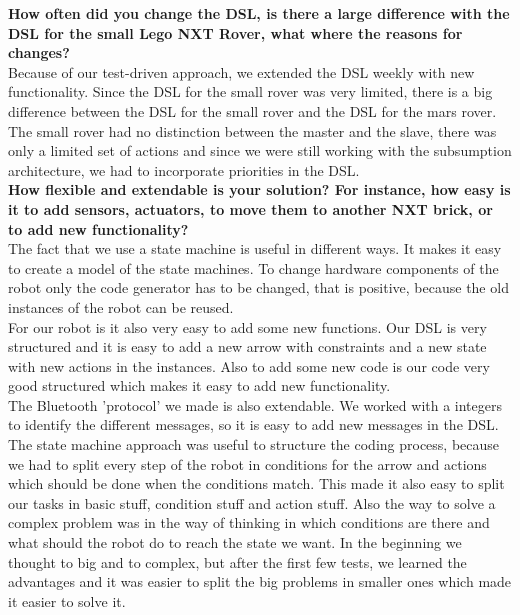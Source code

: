 \documentclass[11pt,a4paper]{article}
\begin{document}
\textbf{How often did you change the DSL, is there a large difference with the DSL for the small Lego NXT Rover, what where the reasons for changes?}\\
Because of our test-driven approach, we extended the DSL weekly with new functionality. Since the DSL for the small rover was very limited, there is a big difference between the DSL for the small rover and the DSL for the mars rover. The small rover had no distinction between the master and the slave, there was only a limited set of actions and since we were still working with the subsumption architecture, we had to incorporate priorities in the DSL.\\

\textbf{How flexible and extendable is your solution? For instance, how easy is it to add sensors, actuators, to move them to another NXT brick, or to add new functionality?}\\
The fact that we use a state machine is useful in different ways. It makes it easy to create a model of the state machines. To change hardware components of the robot only the code generator has to be changed, that is positive, because the old instances of the robot can be reused. \\
For our robot is it also very easy to add some new functions. Our DSL is very structured and it is easy to add a new arrow with constraints and a new state with new actions in the instances. Also to add some new code is our code very good structured which makes it easy to add new functionality. \\
The Bluetooth 'protocol' we made is also extendable. We worked with a integers to identify the different messages, so it is easy to add new messages in the DSL. \\
The state machine approach was useful to structure the coding process, because we had to split every step of the robot in conditions for the arrow and actions which should be done when the conditions match. This made it also easy to split our tasks in basic stuff, condition stuff and action stuff. Also the way to solve a complex problem was in the way of thinking in which conditions are there and what should the robot do to reach the state we want. In the beginning we thought to big and to complex, but after the first few tests, we learned the advantages and it was easier to split the big problems in smaller ones which made it easier to solve it. \\
\end{document}
